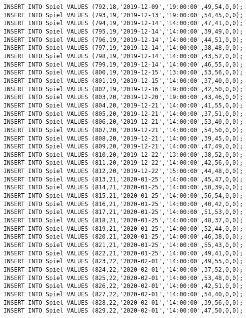 \documentclass{bschlangaul-aufgabe}
\begin{document}
\begin{verbatim}
INSERT INTO Spiel VALUES (792,18,'2019-12-09','19:00:00',49,54,0,0);
INSERT INTO Spiel VALUES (793,19,'2019-12-13','19:00:00',54,45,0,0);
INSERT INTO Spiel VALUES (794,19,'2019-12-14','14:00:00',47,41,0,0);
INSERT INTO Spiel VALUES (795,19,'2019-12-14','14:00:00',39,49,0,0);
INSERT INTO Spiel VALUES (796,19,'2019-12-14','14:00:00',44,51,0,0);
INSERT INTO Spiel VALUES (797,19,'2019-12-14','14:00:00',38,48,0,0);
INSERT INTO Spiel VALUES (798,19,'2019-12-14','14:00:00',43,52,0,0);
INSERT INTO Spiel VALUES (799,19,'2019-12-14','14:00:00',46,55,0,0);
INSERT INTO Spiel VALUES (800,19,'2019-12-15','13:00:00',53,56,0,0);
INSERT INTO Spiel VALUES (801,19,'2019-12-15','14:00:00',37,40,0,0);
INSERT INTO Spiel VALUES (802,19,'2019-12-16','19:00:00',42,50,0,0);
INSERT INTO Spiel VALUES (803,20,'2019-12-20','19:00:00',43,46,0,0);
INSERT INTO Spiel VALUES (804,20,'2019-12-21','14:00:00',41,55,0,0);
INSERT INTO Spiel VALUES (805,20,'2019-12-21','14:00:00',37,51,0,0);
INSERT INTO Spiel VALUES (806,20,'2019-12-21','14:00:00',53,40,0,0);
INSERT INTO Spiel VALUES (807,20,'2019-12-21','14:00:00',54,50,0,0);
INSERT INTO Spiel VALUES (808,20,'2019-12-21','14:00:00',39,45,0,0);
INSERT INTO Spiel VALUES (809,20,'2019-12-21','14:00:00',47,49,0,0);
INSERT INTO Spiel VALUES (810,20,'2019-12-22','13:00:00',38,52,0,0);
INSERT INTO Spiel VALUES (811,20,'2019-12-22','14:00:00',42,56,0,0);
INSERT INTO Spiel VALUES (812,20,'2019-12-22','15:00:00',44,48,0,0);
INSERT INTO Spiel VALUES (813,21,'2020-01-25','14:00:00',45,47,0,0);
INSERT INTO Spiel VALUES (814,21,'2020-01-25','14:00:00',50,39,0,0);
INSERT INTO Spiel VALUES (815,21,'2020-01-25','14:00:00',56,54,0,0);
INSERT INTO Spiel VALUES (816,21,'2020-01-25','14:00:00',40,42,0,0);
INSERT INTO Spiel VALUES (817,21,'2020-01-25','14:00:00',51,53,0,0);
INSERT INTO Spiel VALUES (818,21,'2020-01-25','14:00:00',48,37,0,0);
INSERT INTO Spiel VALUES (819,21,'2020-01-25','14:00:00',52,44,0,0);
INSERT INTO Spiel VALUES (820,21,'2020-01-25','14:00:00',46,38,0,0);
INSERT INTO Spiel VALUES (821,21,'2020-01-25','14:00:00',55,43,0,0);
INSERT INTO Spiel VALUES (822,21,'2020-01-25','14:00:00',49,41,0,0);
INSERT INTO Spiel VALUES (823,22,'2020-02-01','14:00:00',49,55,0,0);
INSERT INTO Spiel VALUES (824,22,'2020-02-01','14:00:00',37,52,0,0);
INSERT INTO Spiel VALUES (825,22,'2020-02-01','14:00:00',53,48,0,0);
INSERT INTO Spiel VALUES (826,22,'2020-02-01','14:00:00',42,51,0,0);
INSERT INTO Spiel VALUES (827,22,'2020-02-01','14:00:00',54,40,0,0);
INSERT INTO Spiel VALUES (828,22,'2020-02-01','14:00:00',39,56,0,0);
INSERT INTO Spiel VALUES (829,22,'2020-02-01','14:00:00',47,50,0,0);

\end{verbatim}
\end{document}
